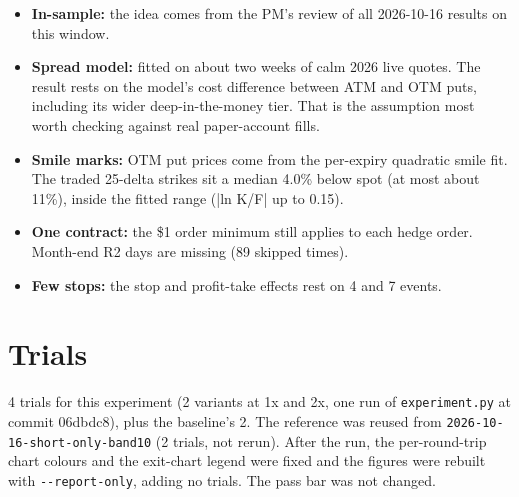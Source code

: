 \documentclass{article}
\begin{document}
\begin{itemize}

\item \textbf{In-sample:} the idea comes from the PM's review of all 2026-10-16 results on this window.

\item \textbf{Spread model:} fitted on about two weeks of calm 2026 live quotes. The result rests on the model's cost difference between ATM and OTM puts, including its wider deep-in-the-money tier. That is the assumption most worth checking against real paper-account fills.

\item \textbf{Smile marks:} OTM put prices come from the per-expiry quadratic smile fit. The traded 25-delta strikes sit a median 4.0\% below spot (at most about 11\%), inside the fitted range (|ln K/\allowbreak{}F| up to 0.15).

\item \textbf{One contract:} the \$1 order minimum still applies to each hedge order. Month-end R2 days are missing (89 skipped times).

\item \textbf{Few stops:} the stop and profit-take effects rest on 4 and 7 events.

\end{itemize}

\section{Trials}

4 trials for this experiment (2 variants at 1x and 2x, one run of \texttt{experiment.\allowbreak{}py} at commit 06dbdc8), plus the baseline's 2. The reference was reused from \texttt{2026-\allowbreak{}10-\allowbreak{}16-\allowbreak{}short-\allowbreak{}only-\allowbreak{}band10} (2 trials, not rerun). After the run, the per-round-trip chart colours and the exit-chart legend were fixed and the figures were rebuilt with \texttt{-\allowbreak{}-\allowbreak{}report-\allowbreak{}only}, adding no trials. The pass bar was not changed.
\end{document}
